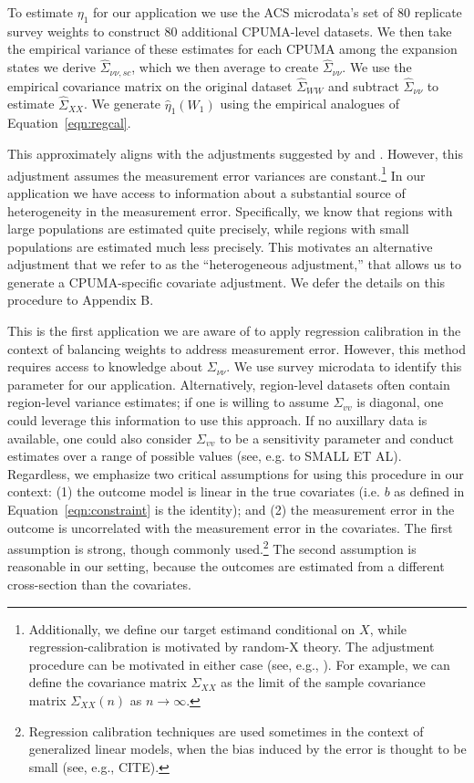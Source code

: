 \documentclass[aoas]{imsart}
\theoremstyle{plain}
\theoremstyle{remark}
\begin{document}
To estimate $\eta_1$ for our application we use the ACS microdata's set of 80 replicate survey weights to construct 80 additional CPUMA-level datasets. We then take the empirical variance of these estimates for each CPUMA among the expansion states we derive $\hat{\Sigma}_{\nu\nu, sc}$, which we then average to create $\hat{\Sigma}_{\nu\nu}$. We use the empirical covariance matrix on the original dataset $\hat{\Sigma}_{WW}$ and subtract $\hat{\Sigma}_{\nu\nu}$ to estimate $\hat{\Sigma}_{XX}$. We generate $\hat{\eta}_1(W_1)$ using the empirical analogues of Equation~\ref{eqn:regcal}. 

This approximately aligns with the adjustments suggested by \cite{carroll2006measurement} and \cite{gleser1992importance}. However, this adjustment assumes the measurement error variances are constant.\footnote{Additionally, we define our target estimand conditional on $X$, while regression-calibration is motivated by random-X theory. The adjustment procedure can be motivated in either case (see, e.g., \cite{gleser1992importance}). For example, we can define the covariance matrix $\Sigma_{XX}$ as the limit of the sample covariance matrix $\Sigma_{XX}(n)$ as $n\to\infty$.} In our application we have access to information about a substantial source of heterogeneity in the measurement error. Specifically, we know that regions with large populations are estimated quite precisely, while regions with small populations are estimated much less precisely. This motivates an alternative adjustment that we refer to as the ``heterogeneous adjustment,'' that allows us to generate a CPUMA-specific covariate adjustment. We defer the details on this procedure to Appendix B.

This is the first application we are aware of to apply regression calibration in the context of balancing weights to address measurement error. However, this method requires access to knowledge about $\Sigma_{\nu\nu}$. We use survey microdata to identify this parameter for our application. Alternatively, region-level datasets often contain region-level variance estimates; if one is willing to assume $\Sigma_{vv}$ is diagonal, one could leverage this information to use this approach. If no auxillary data is available, one could also consider $\Sigma_{vv}$ to be a sensitivity parameter and conduct estimates over a range of possible values (see, e.g. to SMALL ET AL). 
Regardless, we emphasize two critical assumptions for using this procedure in our context: (1) the outcome model is linear in the true covariates (i.e. $b$ as defined in Equation~\ref{eqn:constraint} is the identity); and (2) the measurement error in the outcome is uncorrelated with the measurement error in the covariates. The first assumption is strong, though commonly used.\footnote{Regression calibration techniques are used sometimes in the context of generalized linear models, when the bias induced by the error is thought to be small (see, e.g., CITE).} The second assumption is reasonable in our setting, because the outcomes are estimated from a different cross-section than the covariates. 
\end{document}
